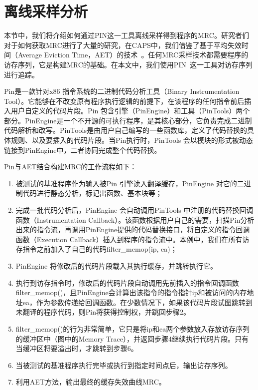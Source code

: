 \section{离线采样分析} \label{sec:prediction_sample}
本节中，我们将介绍如何通过PIN这一工具离线采样得到程序的MRC。研究者们对于如何获取MRC进行了大量的研究，在CAPS中，我们借鉴了基于平均失效时间（Average Eviction Time，AET）的技术~\parencite{hu2016kinect}。任何MRC采样技术都需要程序的访存序列，它是构建MRC的基础。在本文中，我们使用PIN~\parencite{luk2005pin}这一工具对访存序列进行追踪。

Pin是一款针对x86 指令系统的二进制代码分析工具（Binary Instrumentation Tool）。它能够在不改变原有程序执行逻辑的前提下，在该程序的任何指令前后插入用户自定义的代码片段。Pin 包含引擎（PinEngine）和工具（PinTools）两个部分。PinEngine是一个不开源的可执行程序，是其核心部分，它负责完成二进制代码解析和改写。PinTools是由用户自己编写的一些函数库，定义了代码替换的具体规则、以及要插入的代码片段。当Pin执行时，PinTools 会以模块的形式被动态链接到PinEngine中，二者协同完成整个代码替换。

Pin与AET结合构建MRC的工作流程如下：
\begin{enumerate}
\item 被测试的基准程序作为输入被Pin 引擎读入翻译缓存，PinEngine 对它的二进制代码进行静态分析，标记出函数、基本块等；
\item 完成一批代码分析后，PinEngine 会自动调用PinTools 中注册的代码替换回调函数（Instrumentation Callback）。该函数根据用户自己的需要，扫描Pin分析出来的指令流，再调用PinEngine提供的代码替换接口，将自定义的指令回调函数（Execution Callback）插入到程序的指令流中。本例中，我们在所有访存指令之前加入了自己的代码filter\_memop(ip, ea)；
\item PinEngine 将修改后的代码片段载入其执行缓存，并跳转执行它。
\item 执行到访存指令时，修改后的代码片段自动调用先前插入的指令回调函数filter\_memop()，且PinEngine会计算出该指令的指令指针ip和被访问的内存地址ea，作为参数传递给回调函数。在少数情况下，如果该代码片段试图跳转到未翻译的程序代码，则Pin将获得控制权，并跳回步骤2。
\item filter\_memop()的行为非常简单，它只是将ip和ea两个参数放入存放访存序列的缓冲区中（图中的Memory Trace），并返回步骤4继续执行代码片段。只有当缓冲区将要溢出时，才跳转到步骤6。
\item 当被测试的基准程序执行完毕或执行到指定时间点后，输出访存序列。
\item 利用AET方法，输出最终的缓存失效曲线MRC。
\end{enumerate}

